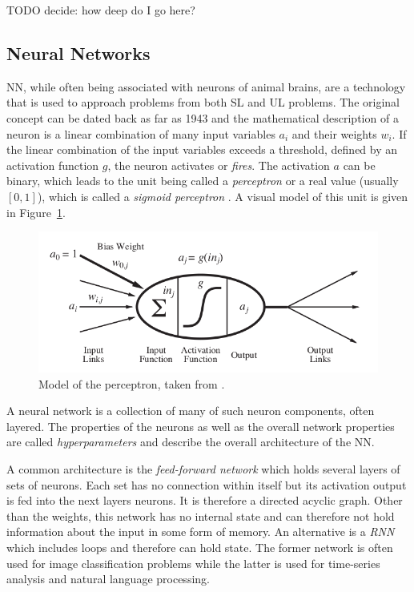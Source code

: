 TODO decide: how deep do I go here?
\subsection{Neural Networks}%
\label{sec:neural_networks}

\acl {NN}, while often being associated with neurons of animal brains, are a technology that is used to approach
problems from both \ac {SL} and \ac {UL} problems. The original concept can be dated back as far as 1943
\cite[p.727]{russell2016artificial} and the mathematical description of a neuron is a linear combination of many input
variables $a_i$ and their weights $w_i$. If the linear combination of the input variables exceeds a threshold, defined
by an activation function $g$, the neuron activates or \emph{fires}.
The activation $a$ can be binary, which leads to the unit being called a \emph{perceptron} or a real value (usually
$[0,1]$), which is called a \emph{sigmoid perceptron} \cite[p.729]{russell2016artificial}. A visual model of this unit
is given in Figure~\ref{fig:perceptron}.

\begin{figure}[]
    \centering
    \includegraphics[width=0.8\linewidth]{img/perceptron.png}
	\caption{Model of the perceptron, taken from \cite[]{russell2016artificial}.}
    \label{fig:perceptron}
\end{figure}

A neural network is a collection of many of such neuron components, often layered. The properties of the neurons as well
as the overall network properties are called \emph{hyperparameters} and describe the overall architecture of the \ac{NN}.

A common architecture is the \emph{feed-forward network} which holds several layers of sets of neurons. Each set has no
connection within itself but its activation output is fed into the next layers neurons. It is therefore a directed
acyclic graph. Other than the weights, this network has no internal state and can therefore not hold information about
the input in some form of memory. An alternative is a \emph{\acl {RNN} } which includes loops and therefore can
hold state. The former network is often used for image classification problems while the latter is used for
time-series analysis and natural language processing.

